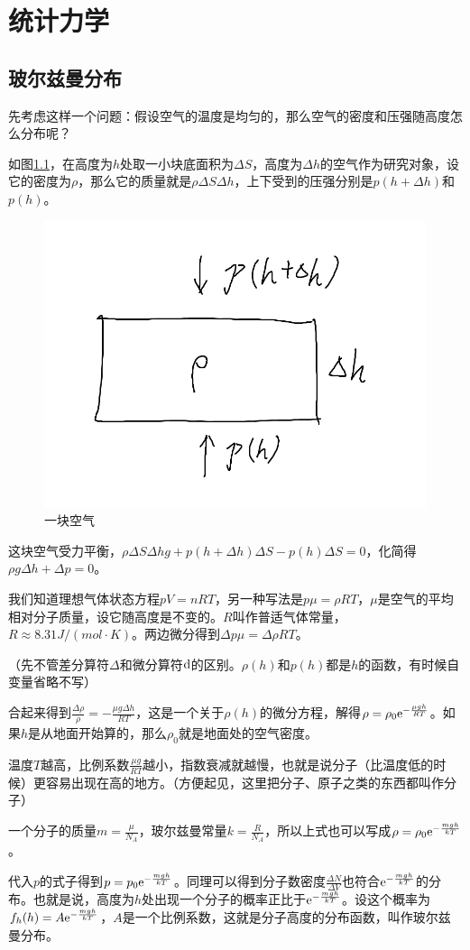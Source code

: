 \chapter{统计力学}
\section{玻尔兹曼分布}
先考虑这样一个问题：假设空气的温度是均匀的，那么空气的密度和压强随高度怎么分布呢？

如图\ref{fig-air-block}，在高度为$h$处取一小块底面积为$\Delta S$，高度为$\Delta h$的空气作为研究对象，设它的密度为$\rho$，那么它的质量就是$\rho \Delta S \Delta h$，上下受到的压强分别是$p(h+\Delta h)$和$p(h)$。
\begin{figure}[htb]
\centering
\includegraphics[width=0.33\linewidth]{fig/air-block.png}
\caption{一块空气}
\label{fig-air-block}
\end{figure}

这块空气受力平衡，$\rho \Delta S \Delta h g+p(h+\Delta h) \Delta S-p(h) \Delta S=0$，化简得$\rho g \Delta h+\Delta p=0$。

我们知道理想气体状态方程$p V=n R T$，另一种写法是$p \mu=\rho R T$，$\mu$是空气的平均相对分子质量，设它随高度是不变的。$R$叫作普适气体常量， $R \approx 8.31 \unit{J/(mol \cdot K)}$。两边微分得到$\Delta p \mu=\Delta \rho R T$。

（先不管差分算符$\Delta$和微分算符$\mathop{}\!\mathrm{d}$的区别。$\rho(h)$和$p(h)$都是$h$的函数，有时候自变量省略不写）

合起来得到$\frac{\Delta \rho}{\rho}=-\frac{\mu g \Delta h}{R T}$，这是一个关于$\rho(h)$的微分方程，解得$\rho=\rho_0 \mathrm{e}^{-\frac{\mu g h}{R T}}$。如果$h$是从地面开始算的，那么$\rho_0$就是地面处的空气密度。

温度$T$越高，比例系数$\frac{\mu g}{R T}$越小，指数衰减就越慢，也就是说分子（比温度低的时候）更容易出现在高的地方。（方便起见，这里把分子、原子之类的东西都叫作分子）

一个分子的质量$m=\frac{\mu}{N_A}$，玻尔兹曼常量$k=\frac{R}{N_A}$，所以上式也可以写成$\rho=\rho_0 \mathrm{e}^{-\frac{m g h}{k T}}$。

代入$p$的式子得到$p=p_0 \mathrm{e}^{-\frac{m g h}{k T}}$。同理可以得到分子数密度$\frac{\Delta N}{\Delta V}$也符合$\mathrm{e}^{-\frac{m g h}{k T}}$的分布。也就是说，高度为$h$处出现一个分子的概率正比于$\mathrm{e}^{-\frac{m g h}{k T}}$。设这个概率为$f_h(h)=A \mathrm{e}^{-\frac{m g h}{k T}}$，$A$是一个比例系数，这就是分子高度的分布函数，叫作玻尔兹曼分布。

